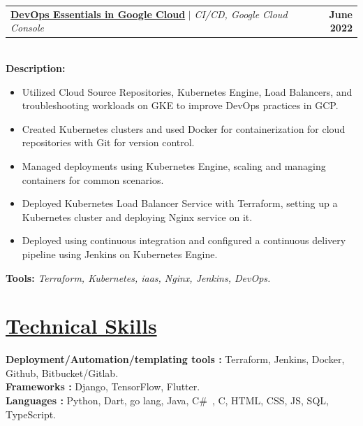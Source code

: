 \documentclass[letterpaper,11pt]{article}
\makeatletter
\newcommand{\resumeItem}[1]{
  \item\small{
    {#1 \vspace{-2pt}}
  }
}
\newcommand{\resumeProjectHeading}[2]{
    \item
    \begin{tabular*}{1.001\textwidth}{l@{\extracolsep{\fill}}r}
      \small#1 & \textbf{\small #2}\\
    \end{tabular*}\vspace{-7pt}
}
\newcommand{\resumeItemListStart}{\begin{itemize}}
\newcommand{\resumeItemListEnd}{\end{itemize}\vspace{-5pt}}
\makeatother
\begin{document}
          \resumeProjectHeading
          {\textbf{\href{https://www.cloudskillsboost.google/public_profiles/6bf05c97-e7a5-48b7-bd37-03938dae9743/badges/2357183}{DevOps Essentials in Google Cloud}} $|$ \emph{CI/CD, Google Cloud Console}}{June 2022}\\
          \vspace{6pt}
          \textbf{Description:}
          \vspace{-5pt}
          \resumeItemListStart
            \resumeItem{Utilized Cloud Source Repositories, Kubernetes Engine, Load Balancers, and troubleshooting workloads on GKE to improve DevOps practices in GCP.}
            \resumeItem{Created Kubernetes clusters and used Docker for containerization for cloud repositories with Git for version control.}
            \resumeItem{Managed deployments using Kubernetes Engine, scaling and managing containers for common scenarios.}
            \resumeItem{Deployed Kubernetes Load Balancer Service with Terraform, setting up a Kubernetes cluster and deploying Nginx service on it.}
            \resumeItem{Deployed using continuous integration and configured a continuous delivery pipeline using Jenkins on Kubernetes Engine.}
          \resumeItemListEnd 
          \vspace{-12pt}
          \textbf{Tools:}\emph{
                Terraform, Kubernetes, iaas, Nginx, Jenkins, DevOps.}
\vspace{-10pt}
\section{\href{https://www.linkedin.com/in/yakkshit/details/skills/}{Technical Skills} \faLink}
\vspace{-5pt}
 \begin{itemize}[leftmargin=0.15in, label={}]
    \small{\item{
     \textbf{Deployment/Automation/templating tools : }{Terraform, Jenkins, Docker, Github, Bitbucket/Gitlab.} \\
     \textbf{Frameworks : }{Django, TensorFlow, Flutter.}\\
     \textbf{Languages : }{ Python, Dart, go lang, Java, C\#\ , C, HTML, CSS, JS, SQL, TypeScript.}\\
    }}
 \end{itemize}
\vspace{-20pt}
\end{document}
